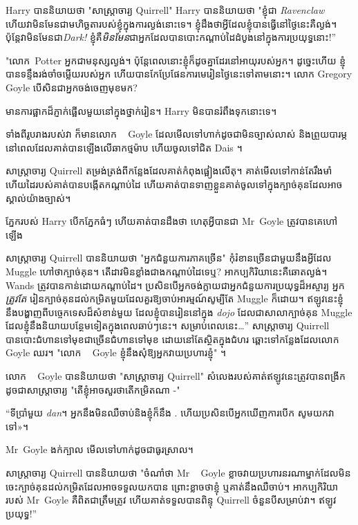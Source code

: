 {{{{Harry បាននិយាយថា "សាស្រ្តាចារ្យ Quirrell" Harry បាននិយាយថា "ខ្ញុំជា \emph{Ravenclaw} ហើយវាមិនមែនជាមហិច្ឆតារបស់ខ្ញុំក្នុងការល្ងង់នោះទេ។ ខ្ញុំដឹងថាអ្វីដែលខ្ញុំបានធ្វើនៅថ្ងៃនេះគឺល្ងង់។ ប៉ុន្តែវាមិនមែនជា\emph{Dark!} ខ្ញុំគឺ\emph{មិនមែន}ជាអ្នកដែលបានបោះកណ្តាប់ដៃដំបូងនៅក្នុងការប្រយុទ្ធនោះ!”

"លោក~Potter អ្នកជាមនុស្សល្ងង់។ ប៉ុន្តែពេលនោះខ្ញុំក៏ដូចគ្នាដែរនៅអាយុរបស់អ្នក។ ដូច្នេះហើយ ខ្ញុំបានទន្ទឹងរង់ចាំចម្លើយរបស់អ្នក ហើយបានកែប្រែផែនការមេរៀនថ្ងៃនេះទៅតាមនោះ។ លោក Gregory Goyle បើសិនជាអ្នកចង់ចេញមុខមក?

មានការផ្អាកដ៏ភ្ញាក់ផ្អើលមួយនៅក្នុងថ្នាក់រៀន។ Harry មិន​បាន​រំពឹង​ទុក​នោះ​ទេ។

ទាំងពីរូបរាងរបស់វា ក៏មានលោក ~ Goyle ដែលមើលទៅហាក់ដូចជាមិនច្បាស់លាស់ និងព្រួយបារម្ភ នៅពេលដែលគាត់បានឡើងលើឆាកថ្មម៉ាប ហើយចូលទៅជិត Dais ។

សាស្រ្តាចារ្យ Quirrell តម្រង់ត្រង់ពីកន្លែងដែលគាត់កំពុងផ្អៀងលើតុ។ គាត់មើលទៅកាន់តែរឹងមាំ ហើយដៃរបស់គាត់បានបង្កើតកណ្តាប់ដៃ ហើយគាត់បានទាញខ្លួនគាត់ចូលទៅក្នុងក្បាច់គុនដែលអាចស្គាល់យ៉ាងច្បាស់។

ភ្នែករបស់ Harry បើកភ្នែកធំៗ ហើយគាត់បានដឹងថា ហេតុអ្វីបានជា Mr~Goyle ត្រូវបានគេហៅឡើង

សាស្រ្តាចារ្យ Quirrell បាននិយាយថា "អ្នកជំនួយការភាគច្រើន" កុំរំខានច្រើនជាមួយនឹងអ្វីដែល Muggle ហៅថាក្បាច់គុន។ តើដាវមិនខ្លាំងជាងកណ្តាប់ដៃទេឬ? អាកប្បកិរិយានេះគឺឆោតល្ងង់។ Wands ត្រូវបានកាន់ដោយកណ្តាប់ដៃ។ ប្រសិនបើអ្នកចង់ក្លាយជាអ្នកជំនួយការប្រយុទ្ធដ៏អស្ចារ្យ អ្នក \emph{ត្រូវតែ} រៀនក្បាច់គុនដល់កម្រិតមួយដែលគួរឱ្យចាប់អារម្មណ៍សូម្បីតែ Muggle ក៏ដោយ។ ឥឡូវនេះខ្ញុំនឹងបង្ហាញពីបច្ចេកទេសដ៏សំខាន់មួយ ដែលខ្ញុំបានរៀននៅក្នុង \emph{dojo} ដែលជាសាលាក្បាច់គុន Muggle ដែលខ្ញុំនឹងនិយាយបន្ថែមទៀតក្នុងពេលឆាប់ៗនេះ។ សម្រាប់ពេលនេះ…” សាស្ត្រាចារ្យ Quirrell បានបោះជំហានទៅមុខជាច្រើនជំហានទៅមុខ ដោយនៅតែស្ថិតក្នុងជំហរ ឆ្ពោះទៅកន្លែងដែលលោក ~ Goyle ឈរ។ "លោក ~ Goyle ខ្ញុំនឹងសុំឱ្យអ្នកវាយប្រហារខ្ញុំ" ។

លោក ~ Goyle បាននិយាយថា "សាស្រ្តាចារ្យ Quirrell" សំលេងរបស់គាត់ឥឡូវនេះត្រូវបានពង្រីកដូចជាសាស្រ្តាចារ្យ "តើខ្ញុំអាចសួរថាតើកម្រិតណា -"

“ទីប្រាំមួយ \emph{dan}។ អ្នក​នឹង​មិន​ឈឺ​ចាប់​និង​ខ្ញុំ​ក៏​នឹង \@. ហើយ​ប្រសិន​បើ​អ្នក​ឃើញ​ការ​បើក សូម​យក​វា​ទៅ»។

Mr~Goyle ងក់ក្បាល មើលទៅហាក់ដូចជាធូរស្រាល។

សាស្ត្រាចារ្យ Quirrell បាននិយាយថា "ចំណាំថា Mr ~ Goyle ខ្លាចវាយប្រហារនរណាម្នាក់ដែលមិនចេះក្បាច់គុនដល់កម្រិតដែលអាចទទួលយកបាន ព្រោះខ្លាចថាខ្ញុំ ឬគាត់នឹងឈឺចាប់។ អាកប្បកិរិយារបស់ Mr~Goyle គឺពិតជាត្រឹមត្រូវ ហើយគាត់ទទួលបានពិន្ទុ Quirrell ចំនួនបីសម្រាប់វា។ ឥឡូវ​ប្រយុទ្ធ!”

}}}}

